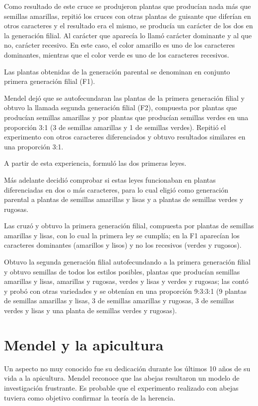 \documentclass{report}
\begin{document}
Como resultado de este cruce se produjeron plantas que producían nada más que semillas amarillas, repitió los cruces con otras plantas de guisante que diferían en otros caracteres y el resultado era el mismo, se producía un carácter de los dos en la generación filial. Al carácter que aparecía lo llamó carácter dominante y al que no, carácter recesivo. En este caso, el color amarillo es uno de los caracteres dominantes, mientras que el color verde es uno de los caracteres recesivos.

Las plantas obtenidas de la generación parental se denominan en conjunto primera generación filial (F1).

Mendel dejó que se autofecundaran las plantas de la primera generación filial y obtuvo la llamada segunda generación filial (F2), compuesta por plantas que producían semillas amarillas y por plantas que producían semillas verdes en una proporción 3:1 (3 de semillas amarillas y 1 de semillas verdes). Repitió el experimento con otros caracteres diferenciados y obtuvo resultados similares en una proporción 3:1.

A partir de esta experiencia, formuló las dos primeras leyes.

Más adelante decidió comprobar si estas leyes funcionaban en plantas diferenciadas en dos o más caracteres, para lo cual eligió como generación parental a plantas de semillas amarillas y lisas y a plantas de semillas verdes y rugosas.

Las cruzó y obtuvo la primera generación filial, compuesta por plantas de semillas amarillas y lisas, con lo cual la primera ley se cumplía; en la F1 aparecían los caracteres dominantes (amarillos y lisos) y no los recesivos (verdes y rugosos).

Obtuvo la segunda generación filial autofecundando a la primera generación filial y obtuvo semillas de todos los estilos posibles, plantas que producían semillas amarillas y lisas, amarillas y rugosas, verdes y lisas y verdes y rugosas; las contó y probó con otras variedades y se obtenían en una proporción 9:3:3:1 (9 plantas de semillas amarillas y lisas, 3 de semillas amarillas y rugosas, 3 de semillas verdes y lisas y una planta de semillas verdes y rugosas).

\chapter{Mendel y la apicultura}

Un aspecto no muy conocido fue su dedicación durante los últimos 10 años de su vida a la apicultura. Mendel reconoce que las abejas resultaron un modelo de investigación frustrante. Es probable que el experimento realizado con abejas tuviera como objetivo confirmar la teoría de la herencia.
\end{document}

